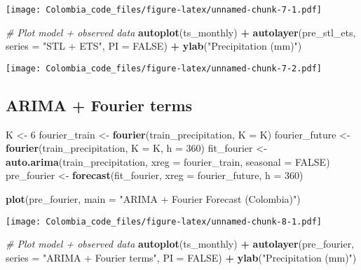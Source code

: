 \documentclass[
]{article}
\newenvironment{Shaded}{\begin{snugshade}}{\end{snugshade}}
\newcommand{\AttributeTok}[1]{\textcolor[rgb]{0.13,0.29,0.53}{#1}}
\newcommand{\CommentTok}[1]{\textcolor[rgb]{0.56,0.35,0.01}{\textit{#1}}}
\newcommand{\ConstantTok}[1]{\textcolor[rgb]{0.56,0.35,0.01}{#1}}
\newcommand{\DecValTok}[1]{\textcolor[rgb]{0.00,0.00,0.81}{#1}}
\newcommand{\FunctionTok}[1]{\textcolor[rgb]{0.13,0.29,0.53}{\textbf{#1}}}
\newcommand{\NormalTok}[1]{#1}
\newcommand{\OtherTok}[1]{\textcolor[rgb]{0.56,0.35,0.01}{#1}}
\newcommand{\SpecialCharTok}[1]{\textcolor[rgb]{0.81,0.36,0.00}{\textbf{#1}}}
\newcommand{\StringTok}[1]{\textcolor[rgb]{0.31,0.60,0.02}{#1}}
\begin{document}
\texttt{[image: Colombia\_code\_files/figure-latex/unnamed-chunk-7-1.pdf]}

\begin{Shaded}
\begin{Highlighting}[]
\CommentTok{\# Plot model + observed data}
\FunctionTok{autoplot}\NormalTok{(ts\_monthly) }\SpecialCharTok{+} \FunctionTok{autolayer}\NormalTok{(pre\_stl\_ets, }\AttributeTok{series =} \StringTok{"STL + ETS"}\NormalTok{,}
    \AttributeTok{PI =} \ConstantTok{FALSE}\NormalTok{) }\SpecialCharTok{+} \FunctionTok{ylab}\NormalTok{(}\StringTok{"Precipitation (mm)"}\NormalTok{)}
\end{Highlighting}
\end{Shaded}

\texttt{[image: Colombia\_code\_files/figure-latex/unnamed-chunk-7-2.pdf]}

\subsection{ARIMA + Fourier terms}\label{arima-fourier-terms}

\begin{Shaded}
\begin{Highlighting}[]
\NormalTok{K }\OtherTok{\textless{}{-}} \DecValTok{6}
\NormalTok{fourier\_train }\OtherTok{\textless{}{-}} \FunctionTok{fourier}\NormalTok{(train\_precipitation, }\AttributeTok{K =}\NormalTok{ K)}
\NormalTok{fourier\_future }\OtherTok{\textless{}{-}} \FunctionTok{fourier}\NormalTok{(train\_precipitation, }\AttributeTok{K =}\NormalTok{ K, }\AttributeTok{h =} \DecValTok{360}\NormalTok{)}
\NormalTok{fit\_fourier }\OtherTok{\textless{}{-}} \FunctionTok{auto.arima}\NormalTok{(train\_precipitation, }\AttributeTok{xreg =}\NormalTok{ fourier\_train,}
    \AttributeTok{seasonal =} \ConstantTok{FALSE}\NormalTok{)}
\NormalTok{pre\_fourier }\OtherTok{\textless{}{-}} \FunctionTok{forecast}\NormalTok{(fit\_fourier, }\AttributeTok{xreg =}\NormalTok{ fourier\_future, }\AttributeTok{h =} \DecValTok{360}\NormalTok{)}

\FunctionTok{plot}\NormalTok{(pre\_fourier, }\AttributeTok{main =} \StringTok{"ARIMA + Fourier Forecast (Colombia)"}\NormalTok{)}
\end{Highlighting}
\end{Shaded}

\texttt{[image: Colombia\_code\_files/figure-latex/unnamed-chunk-8-1.pdf]}

\begin{Shaded}
\begin{Highlighting}[]
\CommentTok{\# Plot model + observed data}
\FunctionTok{autoplot}\NormalTok{(ts\_monthly) }\SpecialCharTok{+} \FunctionTok{autolayer}\NormalTok{(pre\_fourier, }\AttributeTok{series =} \StringTok{"ARIMA + Fourier terms"}\NormalTok{,}
    \AttributeTok{PI =} \ConstantTok{FALSE}\NormalTok{) }\SpecialCharTok{+} \FunctionTok{ylab}\NormalTok{(}\StringTok{"Precipitation (mm)"}\NormalTok{)}
\end{Highlighting}
\end{Shaded}
\end{document}
